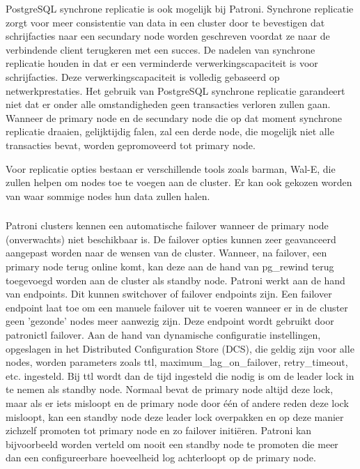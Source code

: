 PostgreSQL synchrone replicatie is ook mogelijk bij Patroni. Synchrone replicatie zorgt voor meer consistentie van data in een cluster door te bevestigen dat schrijfacties naar een secundary node worden geschreven voordat ze naar de verbindende client terugkeren met een succes. De nadelen van synchrone replicatie houden in dat er een verminderde verwerkingscapaciteit is voor schrijfacties. Deze verwerkingscapaciteit is volledig gebaseerd op netwerkprestaties. Het gebruik van PostgreSQL synchrone replicatie garandeert niet dat er onder alle omstandigheden geen transacties verloren zullen gaan. Wanneer de primary node en de secundary node die op dat moment synchrone replicatie draaien, gelijktijdig falen, zal een derde node, die mogelijk niet alle transacties bevat, worden gepromoveerd tot primary node.

Voor replicatie opties bestaan er verschillende tools zoals barman, Wal-E, die zullen helpen om nodes toe te voegen aan de cluster. Er kan ook gekozen worden van waar sommige nodes hun data zullen halen.


\subsubsection{}
\label{subsubsec:Failover}

Patroni clusters kennen een automatische failover wanneer de primary node (onverwachts) niet beschikbaar is. De failover opties kunnen zeer geavanceerd aangepast worden naar de wensen van de cluster. Wanneer, na failover, een primary node terug online komt, kan deze aan de hand van pg\_rewind terug toegevoegd worden aan de cluster als standby node. Patroni werkt aan de hand van endpoints. Dit kunnen switchover of failover endpoints zijn. Een failover endpoint laat toe om een manuele failover uit te voeren wanneer er in de cluster geen 'gezonde' nodes meer aanwezig zijn. Deze endpoint wordt gebruikt door patronictl failover.
Aan de hand van dynamische configuratie instellingen, opgeslagen in het Distributed Configuration Store (DCS), die geldig zijn voor alle nodes, worden parameters zoals ttl, maximum\_lag\_on\_failover, retry\_timeout, etc. ingesteld. Bij ttl wordt dan de tijd ingesteld die nodig is om de leader lock in te nemen als standby node. Normaal bevat de primary node altijd deze lock, maar als er iets misloopt en de primary node door één of andere reden deze lock misloopt, kan een standby node deze leader lock overpakken en op deze manier zichzelf promoten tot primary node en zo failover initiëren. Patroni kan bijvoorbeeld worden verteld om nooit een standby node te promoten die meer dan een configureerbare hoeveelheid log achterloopt op de primary node.



